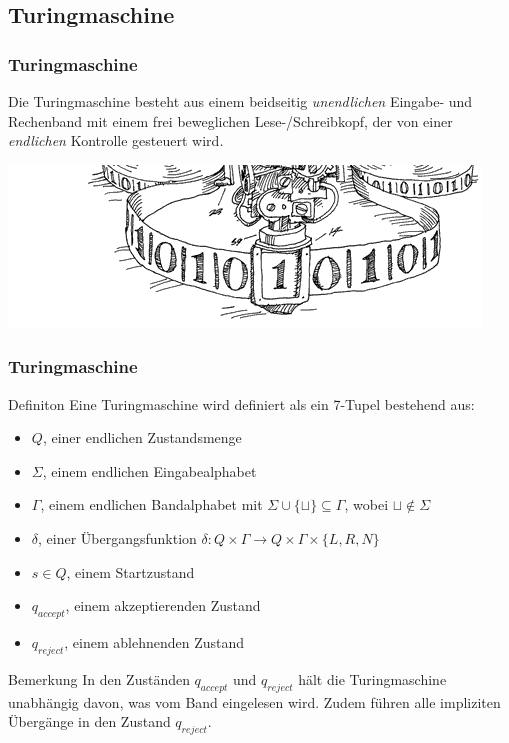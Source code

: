 \subsection{Turingmaschine}
\begin{frame}
	\frametitle{Turingmaschine}
	Die Turingmaschine besteht aus einem beidseitig \emph{unendlichen} Eingabe- und Rechenband
	mit einem frei beweglichen Lese-/Schreibkopf, der von einer \emph{endlichen} Kontrolle gesteuert wird. 
	\begin{center}
		\vspace{1cm}
		\hspace{-12mm}
		\includegraphics[scale=0.5]{images/tmaschine.png}
	\end{center}
\end{frame}
\begin{frame}
\frametitle{Turingmaschine}
\begin{block}{Definiton}
Eine Turingmaschine wird definiert als ein 7-Tupel bestehend aus:
 \begin{itemize}
 \item $Q$, einer endlichen Zustandsmenge
 \item $\Sigma$, einem endlichen Eingabealphabet
 \item $\Gamma$, einem endlichen Bandalphabet mit $\Sigma \cup\{\sqcup\} \subseteq \Gamma$, wobei $\sqcup \notin \Sigma$
 \item $\delta$, einer Übergangsfunktion $\delta: Q\times\Gamma \rightarrow Q\times\Gamma\times\{L, R, N\}$
 \item $s \in Q$, einem Startzustand
 \item $q_{accept}$, einem akzeptierenden Zustand
 \item $q_{reject}$, einem ablehnenden Zustand
 \end{itemize}
\end{block}
\begin{block}{Bemerkung}
 In den Zuständen $q_{accept}$ und $q_{reject}$ hält die Turingmaschine unabhängig davon, was vom Band eingelesen wird. Zudem führen alle impliziten Übergänge in den Zustand $q_{reject}$.
\end{block}
\end{frame}

